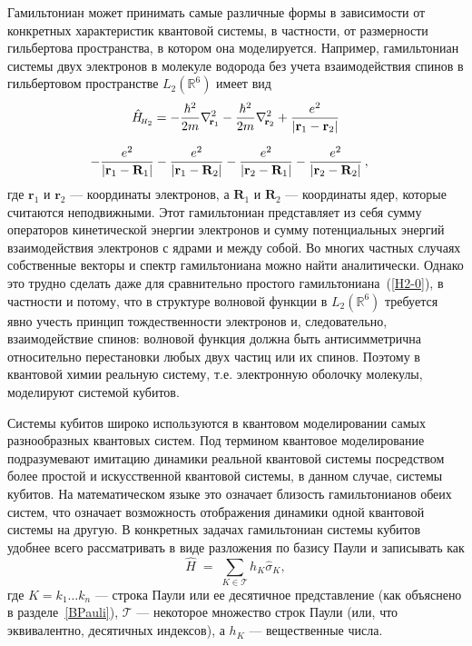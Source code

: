 \documentclass[a4paper]{report}
\begin{document}
Гамильтониан может принимать самые различные формы в зависимости от конкретных характеристик квантовой системы, в частности, от размерности гильбертова пространства, в котором она моделируется. Например, гамильтониан системы двух электронов в молекуле водорода без учета взаимодействия спинов в гильбертовом пространстве $L_2(\mathbb{R}^6)$ имеет вид
\begin{multline}\label{H2-0}
\hat {H}_{\!\scriptscriptstyle H_2}= -\frac{\hbar^2}{2m}\nabla^2_{\!\mathbf{r}_1}- \frac{\hbar^2}{2m}\nabla^2_{\!\mathbf{r}_2}+ \frac{e^2}{|\mathbf{r}_1-\mathbf{r}_2|}
\vphantom{\int\limits_a}\\
-\frac{e^2}{|\mathbf{r}_1-\mathbf{R}_1|}- \frac{e^2}{|\mathbf{r}_1-\mathbf{R}_2|}- \frac{e^2}{|\mathbf{r}_2-\mathbf{R}_1|}- \frac{e^2}{|\mathbf{r}_2-\mathbf{R}_2|}\,, \quad
\end{multline}
где $\mathbf{r}_1$ и $\mathbf{r}_2$ --- координаты электронов, а $\mathbf{R}_1$ и $\mathbf{R}_2$ --- координаты ядер, которые считаются неподвижными. Этот гамильтониан представляет из себя сумму операторов кинетической энергии электронов и сумму потенциальных энергий взаимодействия электронов с ядрами и между собой. Во многих частных случаях собственные векторы и спектр гамильтониана можно найти аналитически. Однако это трудно сделать даже для сравнительно простого гамильтониана~(\ref{H2-0}), в частности и потому, что в структуре волновой функции в $L_2(\mathbb{R}^6)$ требуется явно учесть принцип тождественности электронов и, следовательно, взаимодействие спинов: волновой функция должна быть антисимметрична относительно перестановки любых двух частиц или их спинов. Поэтому в квантовой химии реальную систему, т.е. электронную оболочку молекулы, моделируют системой кубитов.

Системы кубитов широко используются в квантовом моделировании самых разнообразных квантовых систем. Под термином квантовое моделирование подразумевают имитацию динамики реальной квантовой системы посредством более простой и искусственной квантовой системы, в данном случае, системы кубитов. На математическом языке это означает близость гамильтонианов обеих систем, что означает возможность отображения динамики одной квантовой системы на другую. В конкретных задачах гамильтониан системы кубитов удобнее всего рассматривать в виде разложения по базису Паули и записывать как
\begin{equation}\label{ham-pauli}
\hat{H}\;=\; \sum\limits_{K\in\mathcal{T}}h_K\hat{\sigma}_{K},
\end{equation}
где $K=k_1\ldots k_n$ --- строка Паули или ее десятичное представление (как объяснено в разделе~\ref{BPauli}), $\mathcal{T}$ --- некоторое множество строк Паули (или, что эквивалентно, десятичных индексов), а $h_K$ --- вещественные числа.
\end{document}
